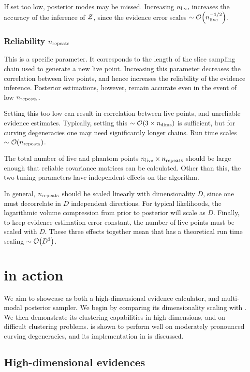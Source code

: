 If set too low, posterior modes may be missed. Increasing $n_{\mathrm{live}}$ increases the accuracy of the inference of $\mathcal{Z}$, since the evidence error scales ${\sim\mathcal{O}{\left(n_{\mathrm{live}}^{-1/2}\right)}}$. 

\subsubsection*{Reliability $n_{\mathrm{repeats}}$}
This is a \PolyChord{} specific parameter. It corresponds to the length of the slice sampling chain used to generate a new live point. Increasing this parameter decreases the correlation between live points, and hence increases the reliability of the evidence inference. Posterior estimations, however, remain accurate even in the event of low $n_{\mathrm{repeats}}$.

Setting this too low can result in correlation between live points, and unreliable evidence estimates. Typically, setting this ${\sim\mathcal{O}{\left(3\times n_{\mathrm{dims}}\right)}}$ is sufficient, but for curving degeneracies one may need significantly longer chains. Run time scales ${\sim\mathcal{O}{\left(n_{\mathrm{repeats}}\right)}}$. 

The total number of live and phantom points ${n_{\mathrm{live}}\times n_{\mathrm{repeats}}}$ should be large enough that reliable covariance matrices can be calculated. Other than this, the two tuning parameters have independent effects on the algorithm. 

In general, $n_{\mathrm{repeats}}$ should be scaled linearly with dimensionality $D$, since one must decorrelate in $D$ independent directions. For typical likelihoods, the logarithmic volume compression from prior to posterior will scale as $D$. Finally, to keep evidence estimation error constant, the number of live points must be scaled with $D$. These three effects together mean that \PolyChord{} has a theoretical run time scaling ${\sim\mathcal{O}{\left(D^3\right)}}$.

\section{\PolyChord{} in action}
\label{sec:pc:polychord_in_action}
We aim to showcase \PolyChord{} as both a high-dimensional evidence calculator, and multi-modal posterior sampler. We begin by comparing its dimensionality scaling with \MultiNest{}. We then demonstrate its clustering capabilities in high dimensions, and on difficult clustering problems. \PolyChord{} is shown to perform well on moderately pronounced curving degeneracies, and its implementation in \CosmoMC{} is discussed.

\subsection{High-dimensional evidences}
\label{sec:pc:hi_ev}

